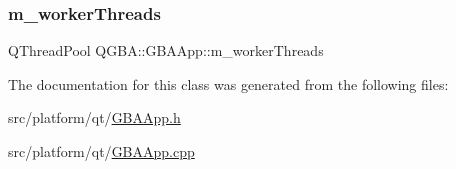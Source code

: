 \mbox{\label{class_q_g_b_a_1_1_g_b_a_app_a7d4cfb16c298c969a400890882f31150}} 
\subsubsection{\texorpdfstring{m\+\_\+worker\+Threads}{m\_workerThreads}}
{\footnotesize\ttfamily Q\+Thread\+Pool Q\+G\+B\+A\+::\+G\+B\+A\+App\+::m\+\_\+worker\+Threads\hspace{0.3cm}{\ttfamily [private]}}



The documentation for this class was generated from the following files\+:\begin{DoxyCompactItemize}
\item 
src/platform/qt/\mbox{\hyperlink{_g_b_a_app_8h}{G\+B\+A\+App.\+h}}\item 
src/platform/qt/\mbox{\hyperlink{_g_b_a_app_8cpp}{G\+B\+A\+App.\+cpp}}\end{DoxyCompactItemize}
